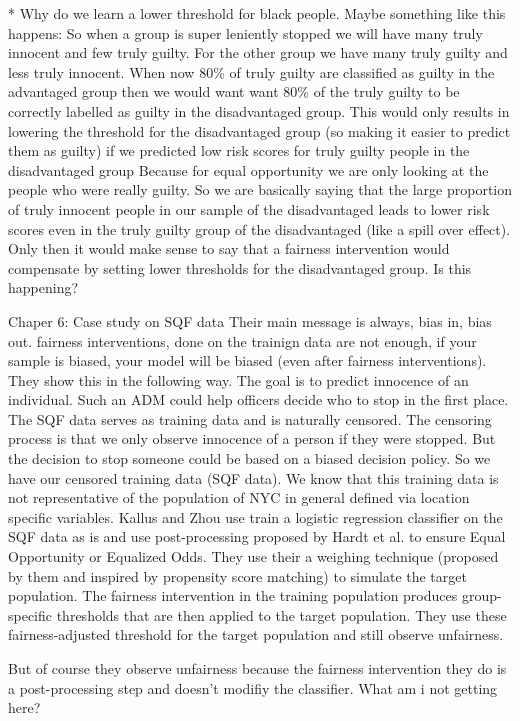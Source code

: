 * Why do we learn a lower threshold for black people. Maybe something like this happens: So when a group is super leniently stopped we will have many truly innocent and few truly guilty.
For the other group we have many truly guilty and less truly innocent. When now 80\% of truly guilty are classified as guilty in the advantaged group then we would want want 80\% of
the truly guilty to be correctly labelled as guilty in the disadvantaged group. This would only results in lowering the threshold for the disadvantaged group
(so making it easier to predict them as guilty) if we predicted low risk scores for truly guilty people in the disadvantaged group
 Because for equal opportunity we are only looking at the people who were really guilty. So we are basically saying that the large proportion of truly
 innocent people in our sample of the disadvantaged leads to lower risk scores even in the truly guilty group of the disadvantaged (like a spill over effect).
 Only then it would make sense to say that a fairness intervention would compensate by setting lower thresholds for the disadvantaged group. Is this happening? 

Chaper 6: Case study on SQF data
Their main message is always, bias in, bias out. fairness interventions, done on the trainign data are not enough, if your sample is biased, your model will be biased (even after fairness interventions).
They show this in the following way. The goal is to predict innocence of an individual. Such an ADM could help officers
decide who to stop in the first place. The SQF data serves as training data and is naturally censored. The censoring process is that we only
observe innocence of a person if they were stopped. But the decision to stop someone could be based on a biased decision policy.
So we have our censored training data (SQF data). We know that this training data is not representative of the population of NYC in general defined via
location specific variables. Kallus and Zhou use train a logistic regression classifier on the SQF data as is and use post-processing proposed
by Hardt et al. to ensure Equal Opportunity or Equalized Odds. They use their a weighing technique (proposed by them and inspired by propensity score matching)
to simulate the target population. The fairness intervention in the training population produces group-specific thresholds that are then applied to the target population.
They use these fairness-adjusted threshold for the target population and still observe unfairness.

But of course they observe unfairness because the fairness intervention they do is a post-processing step and doesn't modifiy the classifier. What am i not getting here?